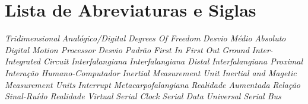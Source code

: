 \chapter*{Lista de Abreviaturas e Siglas}


\begin{acronym}
 {\textit{Tridimensional}}
 {\textit{Analógico/Digital}}
 {\textit{Degrees Of Freedom}}
 {\textit{Desvio Médio Absoluto}}
 {\textit{Digital Motion Processor\texttrademark}}
 {\textit{Desvio Padrão}}
 {\textit{First In First Out}}
 {\textit{Ground}}
 {\textit{Inter-Integrated Circuit}}
 {\textit{Interfalangiana}}
 {\textit{Interfalangiana Distal}}
 {\textit{Interfalangiana Proximal}}
 {\textit{Interação Humano-Computador}}
 {\textit{Inertial Measurement Unit}}
 {\textit{Inertial and Magetic Measurement Units}}
 {\textit{Interrupt}}
 {\textit{Metacarpofalangiana}}
 {\textit{Realidade Aumentada}}
 {\textit{Relação Sinal-Ruído}}
 {\textit{Realidade Virtual}}
 {\textit{Serial Clock}}
 {\textit{Serial Data}}
 {\textit{Universal Serial Bus}}
\end{acronym}
